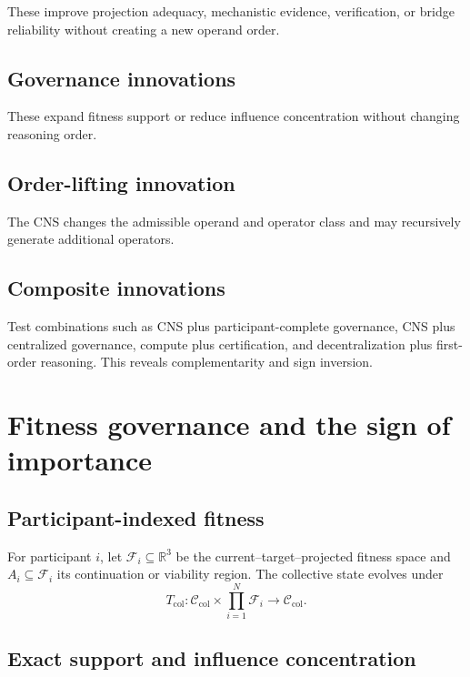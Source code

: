 \documentclass[11pt]{article}
\newcommand{\C}{\mathcal{C}}
\newcommand{\F}{\mathcal{F}}
\begin{document}
These improve projection adequacy, mechanistic evidence, verification, or bridge reliability without creating a new
operand order.

\subsection{Governance innovations}

These expand fitness support or reduce influence concentration without changing reasoning order.

\subsection{Order-lifting innovation}

The CNS changes the admissible operand and operator class and may recursively generate additional operators.

\subsection{Composite innovations}

Test combinations such as CNS plus participant-complete governance, CNS plus centralized governance, compute plus
certification, and decentralization plus first-order reasoning. This reveals complementarity and sign inversion.

\section{Fitness governance and the sign of importance}

\subsection{Participant-indexed fitness}

For participant $i$, let $\F_i\subseteq\mathbb R^3$ be the current--target--projected fitness space and $A_i\subseteq\F_i$ its continuation or
viability region. The collective state evolves under
\begin{equation}
T_{\mathrm{col}}:\C_{\mathrm{col}}\times\prod_{i=1}^{N}\F_i\to\C_{\mathrm{col}}.
\end{equation}

\subsection{Exact support and influence concentration}
\end{document}
